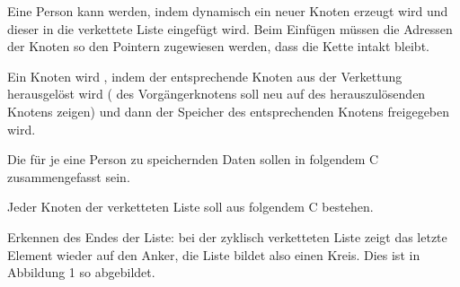 \documentclass[a4paper,10pt,english]{report}
\begin{document}
\sphinxAtStartPar
Eine Person kann  werden, indem dynamisch ein neuer Knoten erzeugt wird und dieser in die verkettete Liste eingefügt wird. Beim Einfügen müssen die Adressen der Knoten so den Pointern zugewiesen werden, dass die Kette intakt bleibt.

\sphinxAtStartPar
Ein Knoten wird , indem der entsprechende Knoten aus der Verkettung herausgelöst wird ( des Vorgängerknotens soll neu auf  des herauszulösenden Knotens zeigen) und dann der Speicher des entsprechenden Knotens freigegeben wird.

\sphinxAtStartPar
{}

\sphinxAtStartPar
Die für je eine Person zu speichernden Daten sollen in folgendem C  zusammengefasst sein.

\begin{sphinxVerbatim}[commandchars=\\\{\}]

  
           \PYG{p}{[}\PYG{p}{]}
           \PYG{p}{[}\PYG{p}{]}
    
 
\end{sphinxVerbatim}

\sphinxAtStartPar
Jeder Knoten der verketteten Liste soll aus folgendem C  bestehen.

\begin{sphinxVerbatim}[commandchars=\\\{\}]
   
               
               
 
\end{sphinxVerbatim}

\sphinxAtStartPar
{}

\sphinxAtStartPar
Erkennen des Endes der Liste: bei der zyklisch verketteten Liste zeigt das letzte Element wie\sphinxhyphen{}der auf den Anker, die Liste bildet also einen Kreis. Dies ist in Abbildung 1 so abgebildet.
\end{document}

